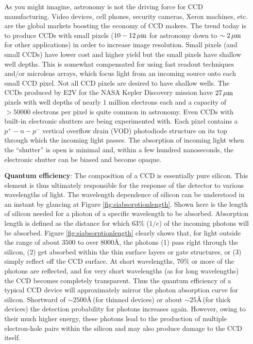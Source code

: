 \documentclass[a4paper,10pt]{article}
\begin{document}
{\noindent}As you might imagine, astronomy is not the driving force for CCD manufacturing. Video devices, cell phones, security cameras, Xerox machines, etc. are the global markets boosting the economy of CCD makers. The trend today is to produce CCDs with small pixels ($10-12\,\mu{\rm m}$ for astronomy down to $\sim2\,\mu{\rm m}$ for other applications) in order to increase image resolution. Small pixels (and small CCDs) have lower cost and higher yield but the small pixels have shallow well depths. This is somewhat compensated for using fast readout techniques and/or microlens arrays, which focus light from an incoming source onto each small CCD pixel. Not all CCD pixels are desired to have shallow wells. The CCDs produced by E2V for the NASA Kepler Discovery mission have $27\,\mu{\rm m}$ pixels with well depths of nearly $1$ million electrons each and a capacity of $>50000$ electrons per pixel is quite common in astronomy. Even CCDs with built-in electronic shutters are being experimented with. Each pixel contains a $p^+-n-p^-$ vertical overflow drain (VOD) photodiode structure on its top through which the incoming light passes. The absorption of incoming light when the ``shutter'' is open is minimal and, within a few hundred nanoseconds, the electronic shutter can be biased and become opaque. 

{\noindent}\textbf{Quantum efficiency}: The composition of a CCD is essentially pure silicon. This element is thus ultimately responsible for the response of the detector to various wavelengths of light. The wavelength dependence of silicon can be understood in an instant by glancing at Figure \ref{fig:siabsorptionlength}. Shown here is the length of silicon needed for a photon of a specific wavelength to be absorbed. Absorption length is defined as the distance for which $63\%$ ($1/e$) of the incoming photons will be absorbed. Figure \ref{fig:siabsorptionlength} clearly shows that, for light outside the range of about $3500$ to over $8000$\AA, the photons (1) pass right through the silicon, (2) get absorbed within the thin surface layers or gate structures, or (3) simply reflect off the CCD surface. At short wavelengths, $70\%$ or more of the photons are reflected, and for very short wavelengths (as for long wavelengths) the CCD becomes completely transparent. Thus the quantum efficiency of a typical CCD device will approximately mirror the photon absorption curve for silicon. Shortward of $\sim2500$\AA\,(for thinned devices) or about $\sim25$\AA\,(for thick devices) the detection probability for photons increases again. However, owing to their much higher energy, these photons lead to the production of multiple electron-hole pairs within the silicon and may also produce damage to the CCD itself.
\end{document}
